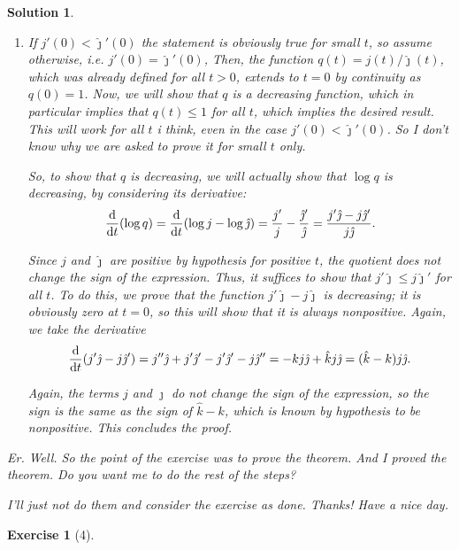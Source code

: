 \documentclass{article}
\theoremstyle{plain}
\newtheorem*{ex}{Exercise}
\theoremstyle{nonumberplain}
\newtheorem{sol}{Solution}
\begin{document}
\begin{sol}
\leavevmode
\begin{enumerate}
\item If $j'(0) < \hat\jmath'(0)$ the statement is obviously true for small $t$, so assume otherwise, i.e. $j'(0) = \hat\jmath'(0)$, Then, the function $q(t) = j(t)/\hat\jmath(t)$, which was already defined for all $t > 0$, extends to $t = 0$ by continuity as $q(0) = 1$. Now, we will show that $q$ is a decreasing function, which in particular implies that $q(t) \leq 1$ for all $t$, which implies the desired result. This will work for all $t$ i think, even in the case $j'(0) < \hat\jmath'(0)$. So I don't know why we are asked to prove it for small $t$ only.

So, to show that $q$ is decreasing, we will actually show that $\log q$ is decreasing, by considering its derivative:
\begin{equation}
\diff{}t (\log q) = \diff{}t (\log j - \log \hat\jmath) = \frac{j'}j - \frac{\hat\jmath'}{\hat\jmath} = \frac{j' \hat\jmath - j \hat\jmath'}{j \hat\jmath}.
\end{equation}

Since $j$ and $\hat\jmath$ are positive by hypothesis for positive $t$, the quotient does not change the sign of the expression. Thus, it suffices to show that $j' \hat\jmath \leq j \hat\jmath'$ for all $t$. To do this, we prove that the function $j' \hat\jmath - j \hat\jmath$ is decreasing; it is obviously zero at $t = 0$, so this will show that it is always nonpositive. Again, we take the derivative
\begin{equation}
\diff*{}t(j' \hat\jmath - j \hat\jmath') = j'' \hat\jmath + j' \hat\jmath' - j'\hat\jmath' - j \hat\jmath'' = - k j \hat\jmath + \hat k j \hat\jmath = (\hat k - k) j \hat\jmath.
\end{equation}

Again, the terms $j$ and $\hat\jmath$ do not change the sign of the expression, so the sign is the same as the sign of $\hat k - k$, which is known by hypothesis to be nonpositive. This concludes the proof.
\end{enumerate}

Er. Well. So the point of the exercise was to prove the theorem. And I proved the theorem. Do you want me to do the rest of the steps?

I'll just not do them and consider the exercise as done. Thanks! Have a nice day.
\end{sol}

\begin{ex}[4]
\end{ex}
\end{document}
